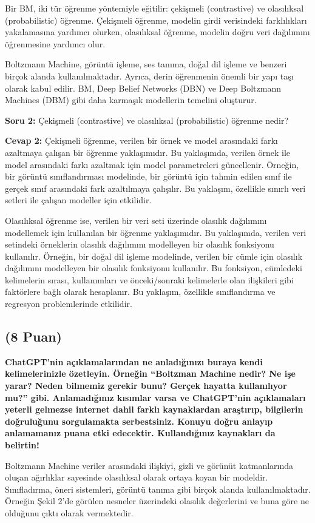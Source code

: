 \documentclass[11pt]{article}
\begin{document}
Bir BM, iki tür öğrenme yöntemiyle eğitilir: çekişmeli (contrastive) ve olasılıksal (probabilistic) öğrenme. Çekişmeli öğrenme, modelin girdi verisindeki farklılıkları yakalamasına yardımcı olurken, olasılıksal öğrenme, modelin doğru veri dağılımını öğrenmesine yardımcı olur.

Boltzmann Machine, görüntü işleme, ses tanıma, doğal dil işleme ve benzeri birçok alanda kullanılmaktadır. Ayrıca, derin öğrenmenin önemli bir yapı taşı olarak kabul edilir. BM, Deep Belief Networks (DBN) ve Deep Boltzmann Machines (DBM) gibi daha karmaşık modellerin temelini oluşturur.


\textbf{Soru 2: } Çekişmeli (contrastive) ve olasılıksal (probabilistic) öğrenme nedir?

\textbf{Cevap 2: } Çekişmeli öğrenme, verilen bir örnek ve model arasındaki farkı azaltmaya çalışan bir öğrenme yaklaşımıdır. Bu yaklaşımda, verilen örnek ile model arasındaki farkı azaltmak için model parametreleri güncellenir. Örneğin, bir görüntü sınıflandırması modelinde, bir görüntü için tahmin edilen sınıf ile gerçek sınıf arasındaki fark azaltılmaya çalışılır. Bu yaklaşım, özellikle sınırlı veri setleri ile çalışan modeller için etkilidir.

Olasılıksal öğrenme ise, verilen bir veri seti üzerinde olasılık dağılımını modellemek için kullanılan bir öğrenme yaklaşımıdır. Bu yaklaşımda, verilen veri setindeki örneklerin olasılık dağılımını modelleyen bir olasılık fonksiyonu kullanılır. Örneğin, bir doğal dil işleme modelinde, verilen bir cümle için olasılık dağılımını modelleyen bir olasılık fonksiyonu kullanılır. Bu fonksiyon, cümledeki kelimelerin sırası, kullanımları ve önceki/sonraki kelimelerle olan ilişkileri gibi faktörlere bağlı olarak hesaplanır. Bu yaklaşım, özellikle sınıflandırma ve regresyon problemlerinde etkilidir.
\newpage
\subsection{(8 Puan)} \textbf{ChatGPT’nin açıklamalarından ne anladığınızı buraya kendi kelimelerinizle özetleyin. Örneğin ``Boltzman Machine nedir? Ne işe yarar? Neden bilmemiz gerekir bunu? Gerçek hayatta kullanılıyor mu?'' gibi. Anlamadığınız kısımlar varsa ve ChatGPT’nin açıklamaları yeterli gelmezse internet dahil farklı kaynaklardan araştırıp, bilgilerin doğruluğunu sorgulamakta serbestsiniz. Konuyu doğru anlayıp anlamamanız puana etki edecektir. Kullandığınız kaynakları da belirtin!}

Boltzmann Machine veriler arasındaki ilişkiyi, gizli ve görünüt katmanlarında oluşan ağırlıklar sayesinde olasılıksal olarak ortaya koyan bir modeldir. Sınıfladırma, öneri sistemleri, görüntü tanıma gibi birçok alanda kullanılmaktadır. Örneğin Şekil 2'de görülen nesneler üzerindeki olasılık değerlerini ve buna göre ne olduğunu çıktı olarak vermektedir.
\end{document}

